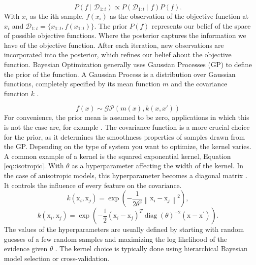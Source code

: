 \begin{equation}
P(f \mid \mathcal{D}_{1:t}) \propto P(\mathcal{D}_{1:t}\mid f) P(f) .
\end{equation}
With $x_i$ as the ith sample, $f(x_i)$ as the observation of the objective function at $x_i$ and $\mathcal{D}_{1:t} = \{x_{1:t},f(x_{1:t})\}$. The prior $P(f)$ represents our belief of the space of possible objective functions. Where the posterior captures the information we have of the objective function. After each iteration, new observations are incorporated into the posterior, which refines our belief about the objective function. Bayesian Optimization generally uses Gaussian Processes (GP) to define the prior of the function. A Gaussian Process is a distribution over Gaussian functions, completely specified by its mean function $m$ and the covariance function $k$ \cite{bo_tutorial}. 

\begin{equation}
    f(x) \sim \mathcal{GP}(m(x), k(x,x'))
\end{equation}
For convenience, the prior mean is assumed to be zero, applications in which this is not the case are, for example \cite{MartinezCantin, Brochu2010}. The covariance function is a more crucial choice for the prior, as it determines the smoothness properties of samples drawn from the GP. Depending on the type of system you want to optimize, the kernel varies. A common example of a kernel is the squared exponential kernel, Equation \ref{eq::isotropic}. With $\theta$ as a hyperparameter affecting the width of the kernel. In the case of anisotropic models, this hyperparameter becomes a diagonal matrix \cite{rasmussen2006gaussian}. It controls the influence of every feature on the covariance.
\begin{equation}\label{eq::isotropic}
k\left(\mathrm{x}_i, \mathrm{x}_j\right)=\exp \left(-\frac{1}{2 \theta^2}\left\|\mathrm{x}_i-\mathrm{x}_j\right\|^2\right),
\end{equation}
\begin{equation}\label{eq::anistropic}
k\left(\mathrm{x}_i, \mathrm{x}_j\right)=\exp \left(-\frac{1}{2}\left(\mathrm{x}_i-\mathrm{x}_j\right)^T \operatorname{diag}(\theta)^{-2}\left(\mathrm{x}-\mathrm{x}^{\prime}\right)\right).
\end{equation}
The values of the hyperparameters are usually defined by starting with random guesses of a few random samples and maximizing the log likelihood of the evidence given $\theta$ \cite{rasmussen2006gaussian, santner2003design}. The kernel choice is typically done using hierarchical Bayesian model selection \cite{mackay1992practical} or cross-validation. 

